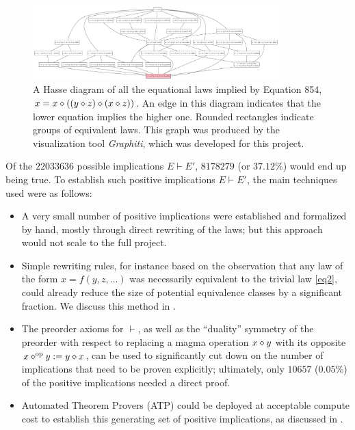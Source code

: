\begin{figure}
\centering
\includegraphics[width=0.85\textwidth]{854.png}
\caption{A Hasse diagram of all the equational laws implied by Equation 854, $x = x \diamond ((y \diamond z) \diamond (x \diamond z))$.  An edge in this diagram indicates that the lower equation implies the higher one. Rounded rectangles indicate groups of equivalent laws.  This graph was produced by the visualization tool \emph{Graphiti}, which was developed for this project.}
\label{fig:854}
\end{figure}


Of the $22033636$ possible implications $E \vdash E'$, $8178279$ (or $37.12\%$) would end up being true. To establish such positive implications $E \vdash E'$, the main techniques used were as follows:

\begin{itemize}
    \item A very small number of positive implications were established and formalized by hand, mostly through direct rewriting of the laws; but this approach would not scale to the full project.
    \item Simple rewriting rules, for instance based on the observation that any law of the form $x = f(y,z,\dots)$ was necessarily equivalent to the trivial law \eqref{eq2}, could already reduce the size of potential equivalence classes by a significant fraction. We discuss this method in .
    \item The preorder axioms for $\vdash$, as well as the ``duality'' symmetry of the preorder with respect to replacing a magma operation $x \diamond y$ with its opposite $x \diamond^{\mathrm{op}} y := y \diamond x$, can be used to significantly cut down on the number of implications that need to be proven explicitly; ultimately, only $10657$ ($0.05\%$) of the positive implications needed a direct proof.
    \item Automated Theorem Provers (ATP) could be deployed at acceptable compute cost to establish this generating set of positive implications, as discussed in .
\end{itemize}

